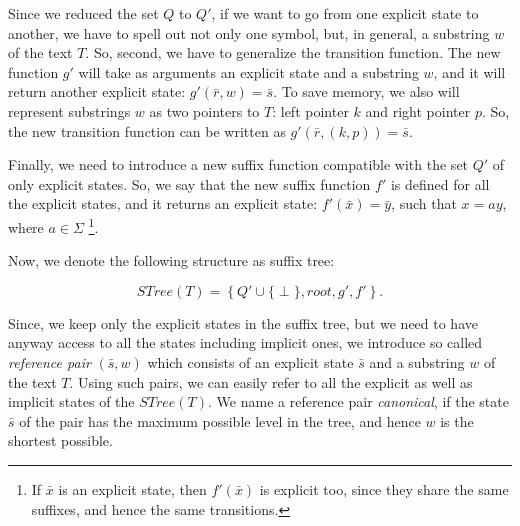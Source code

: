 \documentclass[paper=a4, fontsize=11pt]{scrartcl} %
\numberwithin{equation}{section} %
\numberwithin{figure}{section} %
\numberwithin{table}{section} %
\begin{document}
\par Since we reduced the set $Q$ to $Q'$, if we want to go from one explicit state to another, we have to spell out not only one symbol, but, in general, a substring $w$ of the text $T$. So, second, we have to generalize the transition function. The new function $g'$ will take as arguments an explicit state and a substring $w$, and it will return another explicit state: $g'(\bar{r}, w) = \bar{s}$. To save memory, we also will represent substrings $w$ as two pointers to $T$: left pointer $k$ and right pointer $p$. So, the new transition function can be written as $g'(\bar{r},(k,p)) = \bar{s}$.

\par Finally, we need to introduce a new suffix function compatible with the set $Q'$ of only explicit states. So, we say that the new suffix function $f'$ is defined for all the explicit states, and it returns an explicit state: $f'(\bar{x}) = \bar{y}$, such that $x = ay$, where $a \in \Sigma$ \footnote{If $\bar{x}$ is an explicit state, then $f'(\bar{x})$ is explicit too, since they share the same suffixes, and hence the same transitions.}.

Now, we denote the following structure as suffix tree:

\begin{equation}
STree(T) = \left\{ Q' \cup \{\perp\}, root, g', f' \right\}.
\end{equation}

\par Since, we keep only the explicit states in the suffix tree, but we need to have anyway access to all the states including implicit ones, we introduce so called \textit{reference pair} $(\bar s, w)$ which consists of an explicit state $\bar s$ and a substring $w$ of the text $T$. Using such pairs, we can easily refer to all the explicit as well as implicit states of the $STree(T)$. We name a reference pair \textit{canonical}, if the state $\bar s$ of the pair has the maximum possible level in the tree, and hence $w$ is the shortest possible.
\end{document}
